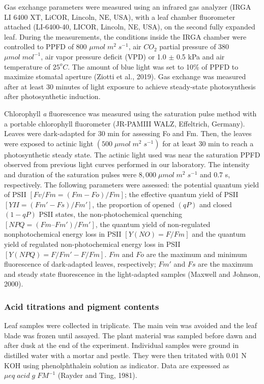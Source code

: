 \documentclass[
  12pt,
  letterpaper,
  DIV=11,
  numbers=noendperiod]{scrartcl}
\begin{document}
Gas exchange parameters were measured using an infrared gas analyzer
(IRGA LI 6400 XT, LiCOR, Lincoln, NE, USA), with a leaf chamber
fluorometer attached (LI-6400-40, LICOR, Lincoln, NE, USA), on the
second fully expanded leaf. During the measurements, the conditions
inside the IRGA chamber were controlled to PPFD of 800
\(\mu mol\;m^{2}\;s^{-1}\), air \(CO_2\) partial pressure of 380
\(\mu mol \; mol^{-1}\), air vapor pressure deficit (VPD) or 1.0 \(\pm\)
0.5 kPa and air temperature of \(25^o C\). The amount of blue light was
set to 10\% of PPFD to maximize stomatal aperture (Ziotti et al., 2019).
Gas exchange was measured after at least 30 minutes of light exposure to
achieve steady-state photosynthesis after photosynthetic induction.

Chlorophyll \emph{a} fluorescence was measured using the saturation
pulse method with a portable chlorophyll fluorometer (JR-PAMIII WALZ,
Effeltrich, Germany). Leaves were dark-adapted for 30 min for assessing
Fo and Fm. Then, the leaves were exposed to actinic light
\((500\; \mu mol\; m^2\; s^{-1})\) for at least 30 min to reach a
photosynthetic steady state. The actinic light used was near the
saturation PPFD observed from previous light curves performed in our
laboratory. The intensity and duration of the saturation pulses were
\(8,000\; \mu mol\; m^2\; s^{-1}\) and 0.7 s, respectively. The
following parameters were assessed: the potential quantum yield of PSII
\([Fv/Fm = (Fm-Fo)/Fm]\); the effective quantum yield of PSII
\([YII = (Fm'- Fs)/Fm']\), the proportion of opened \((qP)\) and closed
\((1-qP)\) PSII states, the non-photochemical quenching
\([NPQ = (Fm – Fm')/Fm']\), the quantum yield of non-regulated
nonphotochemical energy loss in PSII \([Y(NO) = F/Fm]\) and the quantum
yield of regulated non-photochemical energy loss in PSII
\([Y(NPQ) = F/ Fm' - F/Fm]\). \(Fm\) and \(Fo\) are the maximum and
minimum fluorescence of dark-adapted leaves, respectively; \(Fm′\) and
\(Fs\) are the maximum and steady state fluorescence in the
light-adapted samples (Maxwell and Johnson, 2000).

\hypertarget{acid-titrations-and-pigment-contents}{%
\subsubsection{Acid titrations and pigment
contents}\label{acid-titrations-and-pigment-contents}}

Leaf samples were collected in triplicate. The main vein was avoided and
the leaf blade was frozen until assayed. The plant material was sampled
before dawn and after dusk at the end of the experiment. Individual
samples were ground in distilled water with a mortar and pestle. They
were then tritated with 0.01 N KOH using phenolphthalein solution as
indicator. Data are expressed as \(\mu eq\; acid\; g\; FM^{-1}\) (Rayder
and Ting, 1981).
\end{document}
